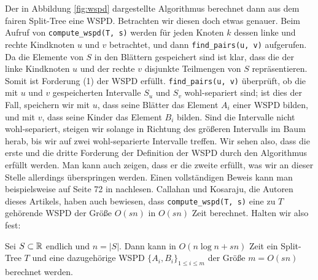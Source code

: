 	Der in Abbildung \ref{fig:wspd} dargestellte Algorithmus berechnet dann aus dem fairen Split-Tree eine WSPD.
	Betrachten wir diesen doch etwas genauer. 
	Beim Aufruf von \texttt{compute\_wspd(T, s)} werden für jeden Knoten $k$ dessen linke und rechte Kindknoten $u$ und $v$ betrachtet, und dann \texttt{find\_pairs(u, v)} aufgerufen. 
	Da die Elemente von $S$ in den Blättern gespeichert sind ist klar, dass die der linke Kindknoten $u$ und der rechte $v$ disjunkte Teilmengen von $S$ repräsentieren. 
	Somit ist Forderung (1) der WSPD erfüllt. \texttt{find\_pairs(u, v)} überprüft, ob die mit $u$ und $v$ gespeicherten Intervalle $S_u$ und $S_v$ wohl-separiert sind; ist dies der Fall, speichern wir mit $u$, dass seine Blätter das Element $A_i$ einer WSPD bilden, und mit $v$, dass seine Kinder das Element $B_i$ bilden. 
	Sind die Intervalle nicht wohl-separiert, steigen wir solange in Richtung des größeren Intervalls im Baum herab, bis wir auf zwei wohl-separierte Intervalle treffen. 
	Wir sehen also, dass die erste und die dritte Forderung der Definition der WSPD durch den Algorithmus erfüllt werden. 
	Man kann auch zeigen, dass er die zweite erfüllt, was wir an dieser Stelle allerdings überspringen werden. 
	Einen vollständigen Beweis kann man beispielsweise auf Seite 72 in \cite{callahan} nachlesen. Callahan und Kosaraju, die Autoren dieses Artikels, haben auch bewiesen, dass \texttt{compute\_wspd(T, s)} eine zu $T$ gehörende WSPD der Größe $O(sn)$ in $O(sn)$ Zeit berechnet. 
	Halten wir also fest:
	\begin{theorem}
		\label{theo:wspdtime}
		Sei $S \subset \mathbb{R}$ endlich und $n = |S|$. Dann kann in $O(n \log n + sn)$ Zeit ein Split-Tree $T$ und eine dazugehörige WSPD $\{A_i, B_i\}_{1 \leq i \leq m}$ der Größe $m = O(sn)$ berechnet werden.
	\end{theorem}
